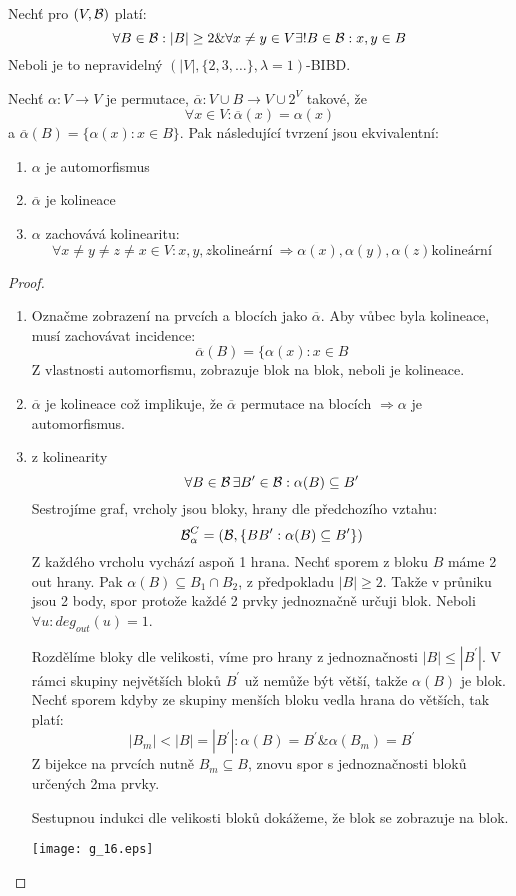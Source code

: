 \begin{theorem}
    Nechť pro $(V,\operatorname{\mathcal{B}})$ platí:
    \[ \forall B \in \operatorname{\mathcal{B}}: |B| \geq 2 \& \forall x \ne y \in V \exists! B \in \operatorname{\mathcal{B}}: x, y \in B \]
    Neboli je to nepravidelný $(|V|, \{ 2, 3, \ldots \}, \lambda = 1)$-BIBD.

    Nechť $\alpha: V\rightarrow V$ je permutace, $\overline{\alpha}: V\cup B\rightarrow V\cup 2^V$ takové, že
    \[ \forall x \in V: \overline{\alpha}(x) = \alpha(x) \]
    a $\overline{\alpha}(B) = \{ \alpha(x): x \in B \}$.
    Pak následující tvrzení jsou ekvivalentní:
    \begin{enumerate}
        \item $\alpha$ je automorfismus
        \item $\overline{\alpha}$ je kolineace
        \item $\alpha$ zachovává kolinearitu:
		\[ \forall x \ne y \ne z \ne x \in V: x, y, z \text{kolineární}\ \Rightarrow \alpha(x), \alpha(y), \alpha(z) \text{kolineární} \]
    \end{enumerate}
\end{theorem}
\begin{proof}
    \begin{enumerate}
        \item Označme zobrazení na prvcích a blocích jako $\overline{\alpha}$.
		Aby vůbec byla kolineace, musí zachovávat incidence:
		\[ \overline{\alpha}(B) = \{ \alpha(x): x \in B \]
		Z vlastnosti automorfismu, zobrazuje blok na blok, neboli je kolineace.
        \item $\overline{\alpha}$ je kolineace což implikuje, že $\overline{\alpha}$ permutace na blocích $\Rightarrow \alpha$ je automorfismus.
        \item z kolinearity
		\[ \forall B \in \operatorname{\mathcal{B}} \exists B^{\prime} \in \operatorname{\mathcal{B}}: \alpha(B) \subseteq B^{\prime} \]
		Sestrojíme graf, vrcholy jsou bloky, hrany dle předchozího vztahu:
		\[ \operatorname{\mathcal{B}}_{\alpha}^C = (\operatorname{\mathcal{B}}, \{ BB^{\prime}: \alpha(B) \subseteq B^{\prime}\}) \]
		Z každého vrcholu vychází aspoň 1 hrana.
		Nechť sporem z bloku $B$ máme 2 out hrany.
		Pak $\alpha(B) \subseteq B_1 \cap B_2$, z předpokladu $|B| \geq 2$.
		Takže v průniku jsou 2 body, spor protože každé 2 prvky jednoznačně určuji blok.
		Neboli $\forall u: deg_{out}(u) = 1$.

		Rozdělíme bloky dle velikosti, víme pro hrany z jednoznačnosti $|B| \leq |B^{\prime}|$.
		V rámci skupiny největších bloků $B^{\prime}$ už nemůže být větší, takže $\alpha(B)$ je blok.
		Nechť sporem kdyby ze skupiny menších bloku vedla hrana do větších, tak platí:
		\[ |B_m| < |B| = |B^{\prime}|: \alpha(B) = B^{\prime} \& \alpha(B_m) = B^{\prime} \]
		Z bijekce na prvcích nutně $B_m \subseteq B$, znovu spor s jednoznačnosti bloků určených 2ma prvky.

		Sestupnou indukci dle velikosti bloků dokážeme, že blok se zobrazuje na blok.

    	\texttt{[image: g\_16.eps]}
    \end{enumerate}
\end{proof}

